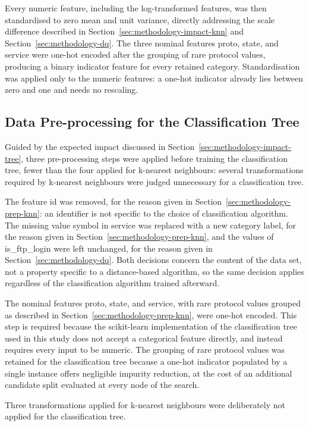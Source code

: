 \documentclass[10pt,conference]{IEEEtran}
\begin{document}
Every numeric feature, including the log-transformed features, was then standardised to zero mean and unit variance, directly addressing the scale difference described in Section~\ref{sec:methodology-impact-knn} and Section~\ref{sec:methodology-dq}. The three nominal features proto, state, and service were one-hot encoded after the grouping of rare protocol values, producing a binary indicator feature for every retained category. Standardisation was applied only to the numeric features: a one-hot indicator already lies between zero and one and needs no rescaling.

\subsection{Data Pre-processing for the Classification Tree}
\label{sec:methodology-prep-tree}

Guided by the expected impact discussed in Section~\ref{sec:methodology-impact-tree}, three pre-processing steps were applied before training the classification tree, fewer than the four applied for k-nearest neighbours: several transformations required by k-nearest neighbours were judged unnecessary for a classification tree.

The feature id was removed, for the reason given in Section~\ref{sec:methodology-prep-knn}: an identifier is not specific to the choice of classification algorithm. The missing value symbol in service was replaced with a new category label, for the reason given in Section~\ref{sec:methodology-prep-knn}, and the values of is\_ftp\_login were left unchanged, for the reason given in Section~\ref{sec:methodology-dq}. Both decisions concern the content of the data set, not a property specific to a distance-based algorithm, so the same decision applies regardless of the classification algorithm trained afterward.

The nominal features proto, state, and service, with rare protocol values grouped as described in Section~\ref{sec:methodology-prep-knn}, were one-hot encoded. This step is required because the scikit-learn implementation of the classification tree used in this study does not accept a categorical feature directly, and instead requires every input to be numeric. The grouping of rare protocol values was retained for the classification tree because a one-hot indicator populated by a single instance offers negligible impurity reduction, at the cost of an additional candidate split evaluated at every node of the search.

Three transformations applied for k-nearest neighbours were deliberately not applied for the classification tree.
\end{document}
